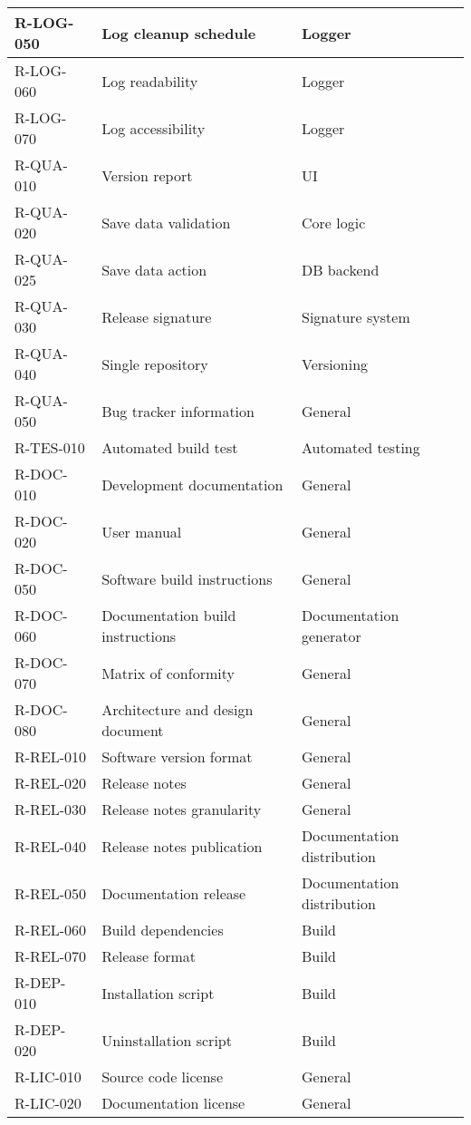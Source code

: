 \begin{longtable}{| p{} |
                    p{} |
                    p{} |}
  R-LOG-050 & Log cleanup schedule & Logger \\ \hline
  R-LOG-060 & Log readability & Logger \\ \hline
  R-LOG-070 & Log accessibility & Logger \\ \hline
  R-QUA-010 & Version report & UI \\ \hline
  R-QUA-020 & Save data validation & Core logic \\ \hline
  R-QUA-025 & Save data action & DB backend \\ \hline
  R-QUA-030 & Release signature & Signature system \\ \hline
  R-QUA-040 & Single repository & Versioning \\ \hline
  R-QUA-050 & Bug tracker information & General \\ \hline
  R-TES-010 & Automated build test & Automated testing \\ \hline
  R-DOC-010 & Development documentation & General \\ \hline
  R-DOC-020 & User manual & General \\ \hline
  R-DOC-050 & Software build instructions & General \\ \hline
  R-DOC-060 & Documentation build instructions & Documentation generator \\ \hline
  R-DOC-070 & Matrix of conformity & General \\ \hline
  R-DOC-080 & Architecture and design document & General \\ \hline
  R-REL-010 & Software version format & General \\ \hline
  R-REL-020 & Release notes & General \\ \hline
  R-REL-030 & Release notes granularity & General \\ \hline
  R-REL-040 & Release notes publication & Documentation distribution \\ \hline
  R-REL-050 & Documentation release & Documentation distribution \\ \hline
  R-REL-060 & Build dependencies & Build \\ \hline
  R-REL-070 & Release format & Build \\ \hline
  R-DEP-010 & Installation script & Build \\ \hline
  R-DEP-020 & Uninstallation script & Build \\ \hline
  R-LIC-010 & Source code license & General \\ \hline
  R-LIC-020 & Documentation license & General \\ \hline
\end{longtable}
